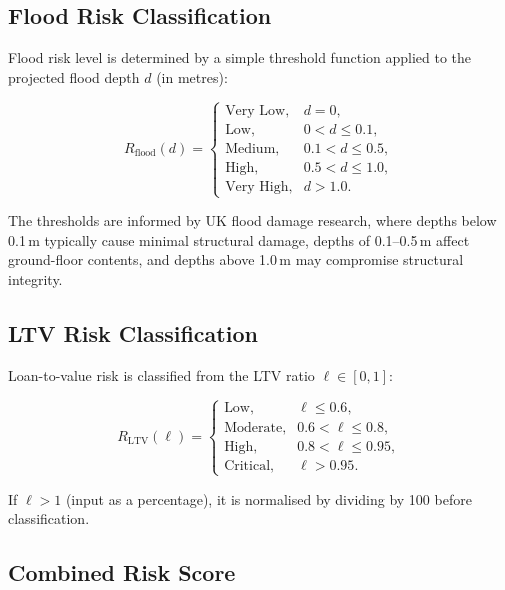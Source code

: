 \documentclass[11pt,a4paper]{article}
\begin{document}
\clearpage

\mkmframework

\subsection{Flood Risk Classification}

Flood risk level is determined by a simple threshold function applied to the projected flood depth $d$ (in metres):

\[
R_{\text{flood}}(d) =
\begin{cases}
\text{Very Low},  & d = 0, \\
\text{Low},       & 0 < d \leq 0.1, \\
\text{Medium},    & 0.1 < d \leq 0.5, \\
\text{High},      & 0.5 < d \leq 1.0, \\
\text{Very High}, & d > 1.0.
\end{cases}
\]

\noindent The thresholds are informed by UK flood damage research, where depths below 0.1\,m typically cause minimal structural damage, depths of 0.1--0.5\,m affect ground-floor contents, and depths above 1.0\,m may compromise structural integrity.

\subsection{LTV Risk Classification}

Loan-to-value risk is classified from the LTV ratio $\ell \in [0, 1]$:

\[
R_{\text{LTV}}(\ell) =
\begin{cases}
\text{Low},      & \ell \leq 0.6, \\
\text{Moderate}, & 0.6 < \ell \leq 0.8, \\
\text{High},     & 0.8 < \ell \leq 0.95, \\
\text{Critical}, & \ell > 0.95.
\end{cases}
\]

\noindent If $\ell > 1$ (input as a percentage), it is normalised by dividing by 100 before classification.

\subsection{Combined Risk Score}
\end{document}
